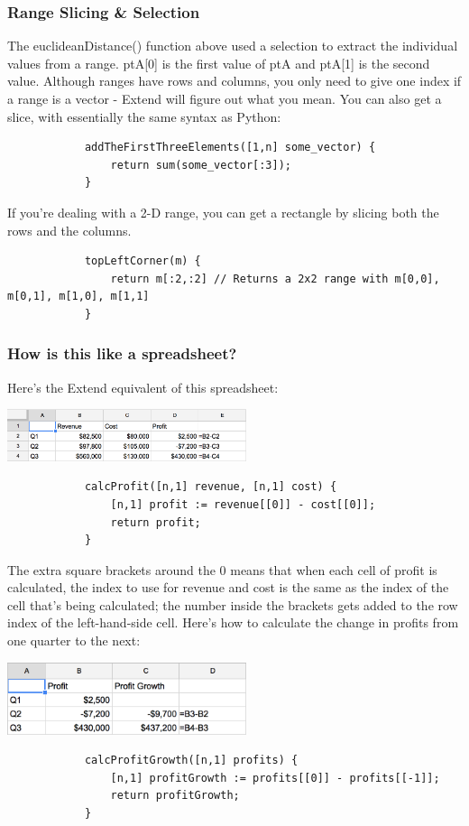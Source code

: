 		\subsubsection{Range Slicing \& Selection}
		The euclideanDistance() function above used a selection to extract the individual values from a range. ptA[0] is the first value of ptA and ptA[1] is the second value. Although ranges have rows and columns, you only need to give one index if a range is a vector - Extend will figure out what you mean. You can also get a slice, with essentially the same syntax as Python:
		\begin{lstlisting}
			addTheFirstThreeElements([1,n] some_vector) {
				return sum(some_vector[:3]);
			}
		\end{lstlisting}
		\medskip \noindent
		If you're dealing with a 2-D range, you can get a rectangle by slicing both the rows and the columns.
		\begin{lstlisting}
			topLeftCorner(m) {
				return m[:2,:2] // Returns a 2x2 range with m[0,0], m[0,1], m[1,0], m[1,1]
			}
		\end{lstlisting}
		\medskip \noindent
		\subsubsection{How is this like a spreadsheet?}
		Here's the Extend equivalent of this spreadsheet:
		\begin{center}
		\includegraphics[width=7cm]{img/tutRCP.png}
		\end{center}
		\begin{lstlisting}
			calcProfit([n,1] revenue, [n,1] cost) {
				[n,1] profit := revenue[[0]] - cost[[0]];
				return profit;
			}
		\end{lstlisting}
		The extra square brackets around the 0 means that when each cell of profit is calculated, the index to use for revenue and cost is the same as the index of the cell that's being calculated; the number inside the brackets gets added to the row index of the left-hand-side cell. Here's how to calculate the change in profits from one quarter to the next:
		\begin{center}
		\includegraphics[width=7cm]{img/tutPG.png}
		\end{center}
		\begin{lstlisting}
			calcProfitGrowth([n,1] profits) {
				[n,1] profitGrowth := profits[[0]] - profits[[-1]];
				return profitGrowth;
			}
		\end{lstlisting}


